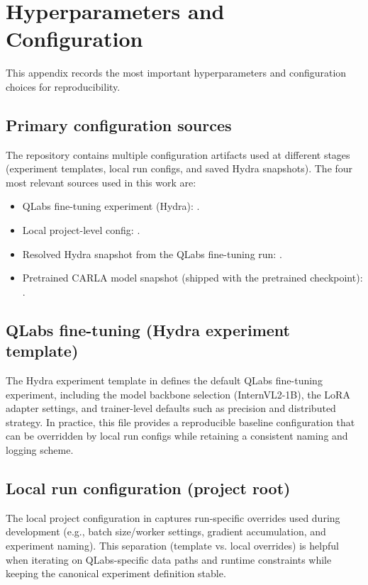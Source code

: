 \chapter{Hyperparameters and Configuration}
\label{app:hyperparameters}

This appendix records the most important hyperparameters and configuration choices for reproducibility.

\section{Primary configuration sources}
The repository contains multiple configuration artifacts used at different stages (experiment templates, local run configs, and saved Hydra snapshots). The four most relevant sources used in this work are:
\begin{itemize}[leftmargin=*]
  \item QLabs fine-tuning experiment (Hydra): .
  \item Local project-level config: .
  \item Resolved Hydra snapshot from the QLabs fine-tuning run: .
  \item Pretrained CARLA model snapshot (shipped with the pretrained checkpoint): .
\end{itemize}

\section{QLabs fine-tuning (Hydra experiment template)}
The Hydra experiment template in  defines the default QLabs fine-tuning experiment, including the model backbone selection (InternVL2-1B), the LoRA adapter settings, and trainer-level defaults such as precision and distributed strategy. In practice, this file provides a reproducible baseline configuration that can be overridden by local run configs while retaining a consistent naming and logging scheme.

\section{Local run configuration (project root)}
The local project configuration in  captures run-specific overrides used during development (e.g., batch size/worker settings, gradient accumulation, and experiment naming). This separation (template vs. local overrides) is helpful when iterating on QLabs-specific data paths and runtime constraints while keeping the canonical experiment definition stable.

